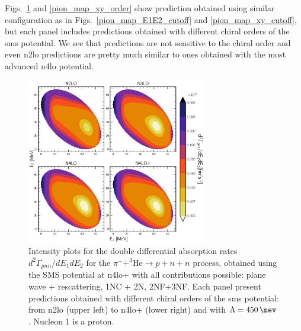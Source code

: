     Figs.~\ref{pion_map_E1E2_order} and \ref{pion_map_xy_order} show prediction obtained using similar configuration
    as in Figs.~\ref{pion_map_E1E2_cutoff} and \ref{pion_map_xy_cutoff}, but each panel includes
    predictions obtained with different chiral orders of the \gls{sms} potential.
    We see that predictions are not sensitive to the chiral order and even \gls{n2lo} predictions
    are pretty much similar to ones obtained with the most advanced \gls{n4lo} potential. 
    
    \begin{figure}[h]
        \begin{center}
            \includegraphics[width=0.7\textwidth]{PlotData/PION/Dalitz_maps/figures/Dalitz_map_pnn_E1E2_orders.pdf}
        \end{center}
        \caption{Intensity plots for the double differential absorption rates
        $d^2 \Gamma_{pnn}/dE_1dE_2$ for the $\pi^- + ^3\text{He} \rightarrow p + n + n$
        process, obtained using the SMS potential at \gls{n4lo+}
        with all contributions possible: plane wave + rescattering, 1NC + 2N, 2NF+3NF.
        Each panel present predictions obtained with different chiral orders of the \gls{sms} potential:
        from \gls{n2lo} (upper left) to \gls{n4lo+} (lower right) and with $\Lambda = \SI{450}{\mev}$.
        Nucleon 1 is a proton.}
        \label{pion_map_E1E2_order}
    \end{figure}

